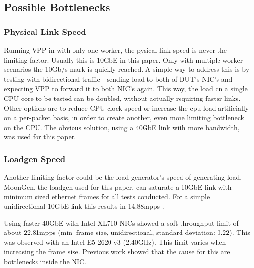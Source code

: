 \subsection{Possible Bottlenecks}

\subsubsection{Physical Link Speed}
\label{sec:linkspeed}


Running VPP in with only one worker, the pysical link speed is never
the limiting factor. Usually this is 10GbE in this paper. Only with
multiple worker scenarios the 10Gb/s mark is quickly reached. A simple
way to address this is by testing with bidirectional traffic - sending
load to both of DUT's NIC's and expecting VPP to forward it to both
NIC's again. This way, the load on a single CPU core to be tested can
be doubled, without actually requiring faster links. Other options are
to reduce CPU clock speed or increase the cpu load artificially on a
per-packet basis, in order to create another, even more limiting
bottleneck on the CPU. The obvious solution, using a 40GbE link with
more bandwidth, was used for this paper.


\subsubsection{Loadgen Speed}


Another limiting factor could be the load generator's speed of
generating load. MoonGen, the loadgen used for this paper, can
saturate a 10GbE link with minimum sized ethernet frames for all tests
conducted. For a simple unidirectional 10GbE link this results in
14.88mpps \cite{emmerich2015assessing}.


\label{sec:40gbelimit}

Using faster 40GbE with Intel XL710 NICs showed a soft throughput
limit of about 22.81mpps (min. frame size, unidirectional, standard
deviation: 0.22). This was observed with an Intel E5-2620 v3
(2.40GHz). This limit varies when increasing the frame size. Previous
work showed that the cause for this are bottlenecks inside the NIC.
\cite{emmerich2015moongen}

